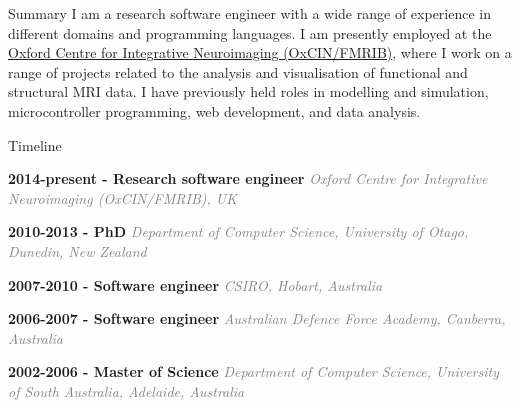 \documentclass{resume}
\author{ Paul McCarthy }
\begin{document}
\maketitle

\begin{category}{Summary}
\citemnobullet I am a research software engineer with a wide range of experience in
different domains and programming languages. I am presently employed
at the \href{https://www.oxcin.ox.ac.uk}{Oxford Centre for Integrative Neuroimaging
(OxCIN/FMRIB)}, where I work on a range of projects related to
the analysis and visualisation of functional and structural MRI
data. I have previously held roles in modelling and simulation,
microcontroller programming, web development, and data analysis.
\end{category}


\begin{category}{Timeline}
\citemnobullet



\item[] \textbf{2014-present - Research software engineer}\newline
\textcolor{grey}{\textit{Oxford Centre for Integrative Neuroimaging (OxCIN/FMRIB), UK}}



\item[] \textbf{2010-2013 - PhD}\newline
\textcolor{grey}{\textit{Department of Computer Science, University of Otago, Dunedin, New Zealand}}



\item[] \textbf{2007-2010 - Software engineer}\newline
\textcolor{grey}{\textit{CSIRO, Hobart, Australia}}



\item[] \textbf{2006-2007 - Software engineer}\newline
\textcolor{grey}{\textit{Australian Defence Force Academy, Canberra, Australia}}



\item[] \textbf{2002-2006 - Master of Science}\newline
\textcolor{grey}{\textit{Department of Computer Science, University of South Australia, Adelaide, Australia}}




\end{category}
\end{document}
